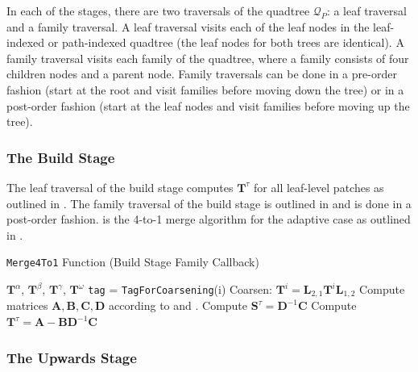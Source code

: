 In each of the stages, there are two traversals of the quadtree $\mathcal{Q}_P$: a leaf traversal and a family traversal. A leaf traversal visits each of the leaf nodes in the leaf-indexed or path-indexed quadtree (the leaf nodes for both trees are identical). A family traversal visits each family of the quadtree, where a family consists of four children nodes and a parent node. Family traversals can be done in a pre-order fashion (start at the root and visit families before moving down the tree) or in a post-order fashion (start at the leaf nodes and visit families before moving up the tree).

\subsubsection{The Build Stage}

The leaf traversal of the build stage computes $\textbf{T}^{\tau}$ for all leaf-level patches as outlined in . The family traversal of the build stage is outlined in  and is done in a post-order fashion.  is the 4-to-1 merge algorithm for the adaptive case as outlined in .

\begin{algorithm}[h]
    \caption{\texttt{Merge4To1} Function (Build Stage Family Callback)}
    \begin{algorithmic}[0]
        \Require $\textbf{T}^{\alpha}$, $\textbf{T}^{\beta}$, $\textbf{T}^{\gamma}$, $\textbf{T}^{\omega}$
            \State \texttt{tag} = \texttt{TagForCoarsening}(i)
                \State Coarsen: $\textbf{T}^{i} = \textbf{L}_{2,1} \textbf{T}^{i} \textbf{L}_{1,2}$
            \EndIf
        \EndFor
        \State Compute matrices $\textbf{A}, \textbf{B}, \textbf{C}, \textbf{D}$ according to  and .
        \State Compute $\textbf{S}^{\tau} = \textbf{D}^{-1} \textbf{C}$
        \State Compute $\textbf{T}^{\tau} = \textbf{A} - \textbf{B} \textbf{D}^{-1} \textbf{C}$
    \end{algorithmic}
    \label{alg:build_merge}
\end{algorithm}

\subsubsection{The Upwards Stage}

